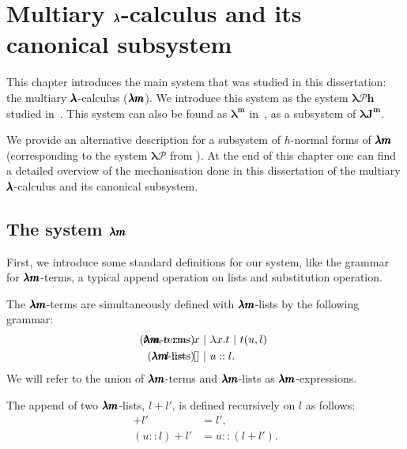 \chapter{Multiary $\pmb{\lambda}$-calculus and its canonical subsystem}
\label{c:multiary}

This chapter introduces the main system that was studied in this dissertation: the multiary $\pmb{\lambda}$-calculus ($\pmb{\lambda m}$).
We introduce this system as the system $\pmb{\lambda \mathcal{P}h}$ studied in~\cite[Chapter~3]{JCES2002}.
This system can also be found as $\pmb{\lambda^m}$ in~\cite[Section~3]{JCESLuis}, as a subsystem of $\pmb{\lambda J^m}$.

We provide an alternative description for a subsystem of $h$-normal forms of $\pmb{\lambda m}$ (corresponding to the system $\pmb{\lambda \mathcal{P}}$ from \cite[Chapter~3]{JCES2002}).
At the end of this chapter one can find a detailed overview of the mechanisation done in this dissertation of the multiary $\pmb{\lambda}$-calculus and its canonical subsystem.

\section{The system $\pmb{\lambda m}$}

First, we introduce some standard definitions for our system, like the grammar for $\pmb{\lambda m}$-terms, a typical append operation on lists and substitution operation.

\begin{definition}
  The $\pmb{\lambda m}$-terms are simultaneously defined with $\pmb{\lambda m}$-lists by the following grammar:  
  \begin{align*} 
    (\LamM \text{-terms}) && \hspace{-2cm} t, u, v &::= \ x \ | \ \lambda x . t \ | \ t(u, l) \ \\
    (\LamM \text{-lists}) && \hspace{-2cm} l       &::= \ []\  | \ u :: l.
  \end{align*}
  We will refer to the union of $\pmb{\lambda m}$-terms and $\pmb{\lambda m}$-lists as $\pmb{\lambda m}$-expressions.
\end{definition}

\begin{definition}[Append]
  The append of two $\pmb{\lambda m}$-lists, $l + l'$, is defined recursively on $l$ as follows:
  \begin{align*}
    [] + l'     &= l', \\
    (u::l) + l' &= u::(l + l').
  \end{align*}
\end{definition}

